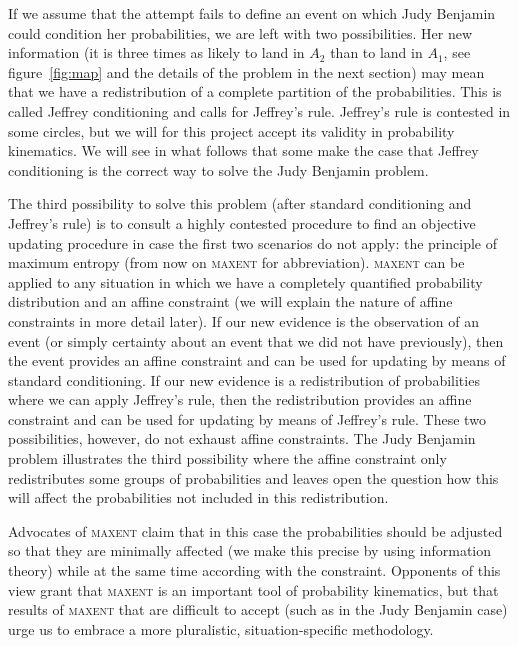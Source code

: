 \documentclass[smallextended]{svjour3}       %
\begin{document}
If we assume that the attempt fails to define an event on which Judy
Benjamin could condition her probabilities, we are left with two
possibilities. Her new information (it is three times as likely to
land in $A_{2}$ than to land in $A_{1}$, see figure~\ref{fig:map} and
the details of the problem in the next section) may mean that we have
a redistribution of a complete partition of the probabilities. This is
called Jeffrey conditioning and calls for Jeffrey's rule. Jeffrey's
rule is contested in some circles, but we will for this project accept
its validity in probability kinematics. We will see in what follows
that some make the case that Jeffrey conditioning is the correct way
to solve the Judy Benjamin problem.

The third possibility to solve this problem (after standard
conditioning and Jeffrey's rule) is to consult a highly contested
procedure to find an objective updating procedure in case the first
two scenarios do not apply: the principle of maximum entropy (from now
on \textsc{maxent} for abbreviation). \textsc{maxent} can be applied
to any situation in which we have a completely quantified probability
distribution and an affine constraint (we will explain the nature of
affine constraints in more detail later). If our new evidence is the
observation of an event (or simply certainty about an event that we
did not have previously), then the event provides an affine constraint
and can be used for updating by means of standard conditioning. If our
new evidence is a redistribution of probabilities where we can apply
Jeffrey's rule, then the redistribution provides an affine constraint
and can be used for updating by means of Jeffrey's rule. These two
possibilities, however, do not exhaust affine constraints. The Judy
Benjamin problem illustrates the third possibility where the affine
constraint only redistributes some groups of probabilities and leaves
open the question how this will affect the probabilities not included
in this redistribution.

Advocates of \textsc{maxent} claim that in this case the probabilities
should be adjusted so that they are minimally affected (we make this
precise by using information theory) while at the same time according
with the constraint. Opponents of this view grant that \textsc{maxent}
is an important tool of probability kinematics, but that results of
\textsc{maxent} that are difficult to accept (such as in the Judy
Benjamin case) urge us to embrace a more pluralistic,
situation-specific methodology.
\end{document}
